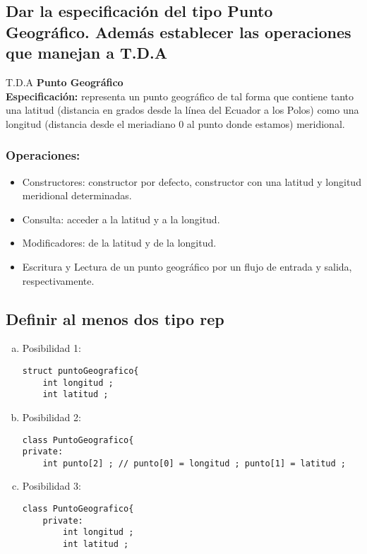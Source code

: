 \subsection{Dar la especificación del tipo Punto Geográfico. Además establecer las operaciones
	que manejan a T.D.A}
T.D.A \textbf{Punto Geográfico}\\

\textbf{Especificación:} representa un punto geográfico de tal forma que contiene tanto una latitud (distancia en grados desde la línea del Ecuador a los Polos) como una longitud (distancia desde el meriadiano 0 al punto donde estamos) meridional.

\subsubsection{Operaciones:}
\begin{itemize}
	\item Constructores: constructor por defecto, constructor con una latitud y longitud meridional determinadas.
	\item Consulta: acceder a la latitud y a la longitud.
	\item Modificadores: de la latitud y de la longitud.
	\item Escritura y Lectura de un punto geográfico por un flujo de entrada y salida, respectivamente.
\end{itemize}

\subsection{Definir al menos dos tipo rep}
\begin{enumerate}[a)]
\item Posibilidad 1:
\begin{lstlisting}[style=cmas]
struct puntoGeografico{
	int longitud ; 
	int latitud ; 
\end{lstlisting}
\setlength{\parskip}{-4mm}
\item Posibilidad 2:
\begin{lstlisting}[style=cmas]
class PuntoGeografico{
private:
	int punto[2] ; // punto[0] = longitud ; punto[1] = latitud ;
\end{lstlisting}
\newpage
\item Posibilidad 3:
\begin{lstlisting}[style=cmas]
class PuntoGeografico{
	private:
		int longitud ; 
		int latitud ;	
\end{lstlisting}
\end{enumerate}

